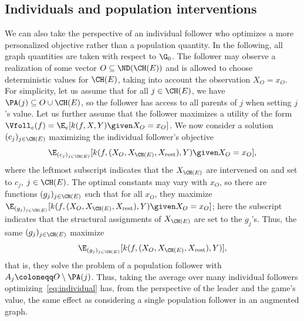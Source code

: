 \subsection{Individuals and population interventions} \label{sec:individuals}
We can also take the perspective of an individual follower who optimizes a more personalized objective rather than a population quantity. In the following, all graph quantities are taken with respect to $\G_0$.
The follower may observe a realization of some vector $O \subseteq \ND(\CH(E))$ 
and is allowed to
choose deterministic values 
for $\CH(E)$, taking into account the observation $X_O=x_O$.
For simplicity, let us assume that for all $j \in \CH(E)$, we have 
$\PA(j) \subseteq O \cup \CH(E)$, so the follower has access to all parents of $j$ when setting $j$'s value. 
Let us further assume that the follower maximizes a utility of the form 
$\Vfoll_e(f) = \E_e[k(f,X,Y) \given X_O=x_O]$.
We now consider a solution 
$(c_j)_{j \in \CH(E)}$ maximizing the individual follower's objective 
\begin{equation} \label{eq:individual}
    \E_{(c_j)_{j \in \CH(E)}}[k(f,(X_O,X_{\CH(E)},X_{\mathrm{rest}}),Y)\given X_O=x_O],
\end{equation}
where the leftmost subscript %
indicates that the  $X_{\CH(E)}$ are intervened on and set to $c_j$, $j \in \CH(E)$. 
The optimal constants may vary with $x_O$, so there are functions 
$(g_j)_{j \in \CH(E)}$
such that for all $x_O$, they maximize
$
\E_{(g_j)_{j \in \CH(E)}}[k(f,(X_O,X_{\CH(E)},X_{\mathrm{rest}}),Y) \given X_O=x_O]$;
here the subscript indicates that the structural assignments of $X_{\CH(E)}$ are 
set to the
$g_j$'s.
Thus, the same $(g_j)_{j \in \CH(E)}$ maximize %
$$
\E_{(g_j)_{j \in \CH(E)}}[k(f,(X_O,X_{\CH(E)},X_{\mathrm{rest}}),Y)],
$$
that is, they solve the problem of a population follower with
$A_j \coloneqq O \setminus \PA(j)$.
Thus, taking the average over many individual followers optimizing~\eqref{eq:individual} has,
from the perspective of the leader and the game's value, the same effect as considering a single population follower in an augmented graph.

